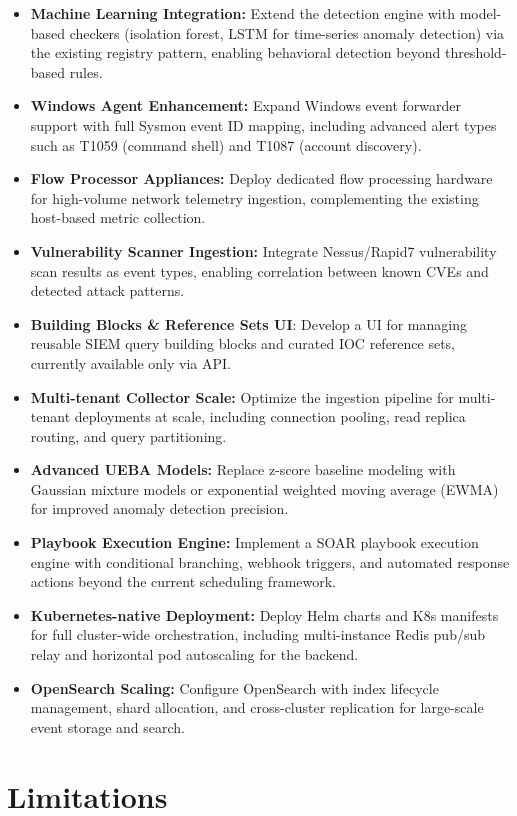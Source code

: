 \begin{itemize}
    \item \textbf{Machine Learning Integration:} Extend the detection engine with model-based checkers (isolation forest, LSTM for time-series anomaly detection) via the existing registry pattern, enabling behavioral detection beyond threshold-based rules.
    \item \textbf{Windows Agent Enhancement:} Expand Windows event forwarder support with full Sysmon event ID mapping, including advanced alert types such as T1059 (command shell) and T1087 (account discovery).
    \item \textbf{Flow Processor Appliances:} Deploy dedicated flow processing hardware for high-volume network telemetry ingestion, complementing the existing host-based metric collection.
    \item \textbf{Vulnerability Scanner Ingestion:} Integrate Nessus/Rapid7 vulnerability scan results as event types, enabling correlation between known CVEs and detected attack patterns.
    \item \textbf{Building Blocks \& Reference Sets UI}: Develop a UI for managing reusable SIEM query building blocks and curated IOC reference sets, currently available only via API.
    \item \textbf{Multi-tenant Collector Scale:} Optimize the ingestion pipeline for multi-tenant deployments at scale, including connection pooling, read replica routing, and query partitioning.
    \item \textbf{Advanced UEBA Models:} Replace z-score baseline modeling with Gaussian mixture models or exponential weighted moving average (EWMA) for improved anomaly detection precision.
    \item \textbf{Playbook Execution Engine:} Implement a SOAR playbook execution engine with conditional branching, webhook triggers, and automated response actions beyond the current scheduling framework.
    \item \textbf{Kubernetes-native Deployment:} Deploy Helm charts and K8s manifests for full cluster-wide orchestration, including multi-instance Redis pub/sub relay and horizontal pod autoscaling for the backend.
    \item \textbf{OpenSearch Scaling:} Configure OpenSearch with index lifecycle management, shard allocation, and cross-cluster replication for large-scale event storage and search.
\end{itemize}

\section{Limitations}

